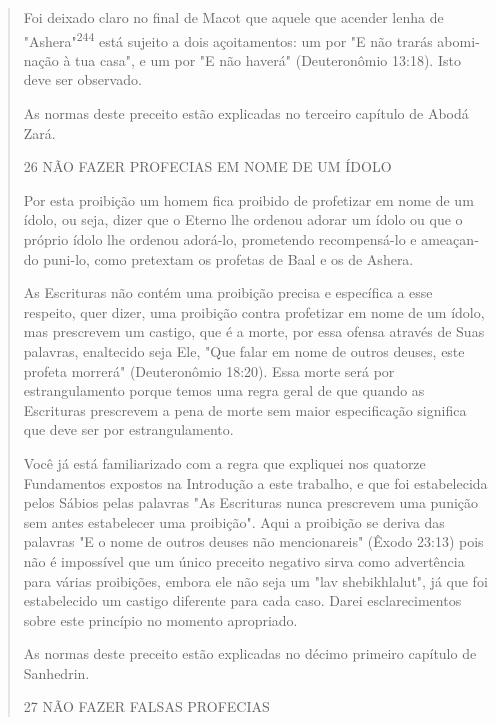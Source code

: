 \begin{quote}
Foi deixado claro no final de Macot que aquele que acender lenha de
"Ashera"\textsuperscript{244} está sujeito a dois açoitamentos: um por
"E não trarás abomi­nação à tua casa", e um por "E não haverá"
(Deuteronômio 13:18). Isto deve ser observado.

As normas deste preceito estão explicadas no terceiro capítulo de Abodá
Zará.

26 NÃO FAZER PROFECIAS EM NOME DE UM ÍDOLO

Por esta proibição um homem fica proibido de profetizar em nome de um
ídolo, ou seja, dizer que o Eterno lhe ordenou adorar um ídolo ou que o
próprio ídolo lhe ordenou adorá-lo, prometendo recompensá-lo e
ameaçan­do puni-lo, como pretextam os profetas de Baal e os de Ashera.

As Escrituras não contém uma proibição precisa e específica a esse
respeito, quer dizer, uma proibição contra profetizar em nome de um
ídolo, mas prescrevem um castigo, que é a morte, por essa ofensa através
de Suas pa­lavras, enaltecido seja Ele, "Que falar em nome de outros
deuses, este profeta morrerá" (Deuteronômio 18:20). Essa morte será por
estrangulamento porque temos uma regra geral de que quando as Escrituras
prescrevem a pena de mor­te sem maior especificação significa que deve
ser por estrangulamento.

Você já está familiarizado com a regra que expliquei nos quatorze
Fundamentos expostos na Introdução a este trabalho, e que foi
estabelecida pelos Sábios pelas palavras "As Escrituras nunca prescrevem
uma punição sem antes estabelecer uma proibição". Aqui a proibição se
deriva das palavras "E o nome de outros deuses não mencionareis" (Êxodo
23:13) pois não é impossí­vel que um único preceito negativo sirva como
advertência para várias proibi­ções, embora ele não seja um "lav
shebikhlalut", já que foi estabelecido um castigo diferente para cada
caso. Darei esclarecimentos sobre este princípio no momento apropriado.

As normas deste preceito estão explicadas no décimo primeiro capí­tulo
de Sanhedrin.

27 NÃO FAZER FALSAS PROFECIAS
\end{quote}

